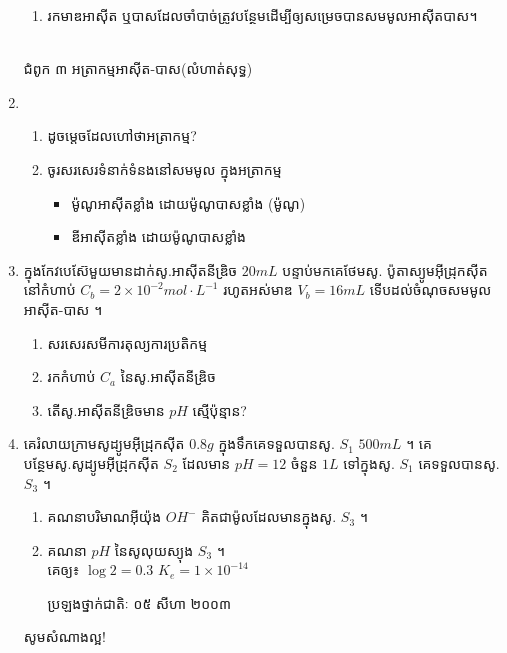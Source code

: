 \documentclass[12pt, a5paper]{article}
\begin{document}
\begin{enumerate}[m]
\begin{enumerate}[k]
		\item រកមាឌអាស៊ីត ឬបាសដែលចាំបាច់ត្រូវបន្ថែមដើម្បីឲ្យសម្រេចបានសមមូលអាស៊ីតបាស។
	\end{enumerate}
	\begin{center}
		\sffamily\color{black}
		\\
		ជំពូក ៣ អត្រាកម្មអាស៊ីត-បាស(លំហាត់សុទ្ធ)
	\end{center}
	\item\begin{enumerate}[k]
		\item ដូចម្តេចដែលហៅថាអត្រាកម្ម?
		\item ចូរសរសេរទំនាក់ទំនងនៅសមមូល ក្នុងអត្រាកម្ម
		\begin{itemize}
			\item ម៉ូណូអាស៊ីតខ្លាំង ដោយម៉ូណូបាសខ្លាំង (ម៉ូណូ)
			\item ឌីអាស៊ីតខ្លាំង ដោយម៉ូណូបាសខ្លាំង
		\end{itemize}
	\end{enumerate}
	\item ក្នុងកែវបេស៊ែមួយមានដាក់សូ.អាស៊ីតនីឌ្រិច $20mL$ បន្ទាប់មកគេថែមសូ. ប៉ូតាស្យូមអ៊ីដ្រុកស៊ីត នៅកំហាប់ $C_b=2\times10^{-2}mol\cdot L^{-1}$ រហូតអស់មាឌ $V_b=16mL$ ទើបដល់ចំណុចសមមូលអាស៊ីត-បាស ។
	\begin{enumerate}[k]
		\item សរសេរសមីការតុល្យការប្រតិកម្ម
		\item រកកំហាប់ $C_a$ នៃសូ.អាស៊ីតនីឌ្រិច
		\item តើសូ.អាស៊ីតនីឌ្រិចមាន $pH$ ស្មើប៉ុន្មាន?
	\end{enumerate}
	\item គេរំលាយក្រាមសូដ្យូមអ៊ីដ្រុកស៊ីត $0.8g$ ក្នុងទឹកគេទទួលបានសូ. $S_1$ $500mL$ ។ គេបន្ថែមសូ.សូដ្យូមអ៊ីដ្រុកស៊ីត $S_2$ ដែលមាន $pH=12$ ចំនួន $1L$ ទៅក្នុងសូ. $S_1$ គេទទួលបានសូ. $S_3$ ។
	\begin{enumerate}[k]
		\item គណនាបរិមាណអ៊ីយ៉ុង $OH^-$ គិតជាម៉ូលដែលមានក្នុងសូ. $S_3$ ។
		\item គណនា $pH$ នៃសូលុយស្យុង $S_3$ ។\\
		គេឲ្យ៖ $\log2=0.3$ $K_e=1\times10^{-14}$
		\begin{center}
			ប្រឡងថ្នាក់ជាតិៈ ០៥ សីហា ២០០៣
		\end{center}
	\end{enumerate}
	\begin{center}
		\sffamily\color{black}
		សូមសំណាងល្អ!
	\end{center}\newpage
	\begin{center}

\end{center}
\end{enumerate}
\end{document}
